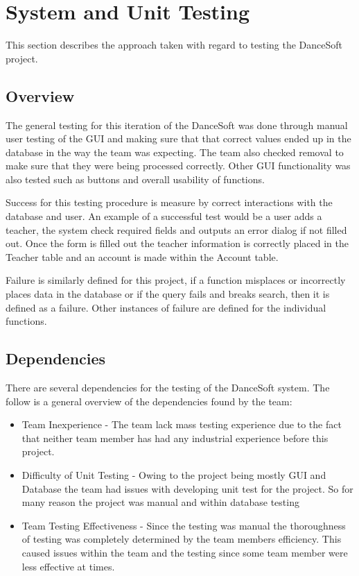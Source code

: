 

\chapter{System  and Unit Testing}

This section describes the approach taken with regard to testing the DanceSoft project. 

\section{Overview}
The general testing for this iteration of the DanceSoft was done through manual user testing of the GUI and making sure that that correct values ended up in the database in the way the team was expecting. The team also checked removal to make sure that they were being processed correctly. Other GUI functionality was also tested such as buttons and overall usability of functions.

Success for this testing procedure is measure by correct interactions with the database and user. An example of a successful test would be a user adds a teacher, the system check required fields and outputs an error dialog if not filled out. Once the form is filled out the teacher information is correctly placed in the Teacher table and an account is made within the Account table.

Failure is similarly defined for this project, if a function misplaces or incorrectly places data in the database or if the query fails and breaks search, then it is defined as a failure. Other instances of failure are defined for the individual functions.

\section{Dependencies}
There are several dependencies for the testing of the DanceSoft system. The follow is a general overview of the dependencies found by the team:

\begin{itemize}
\item Team Inexperience - The team lack mass testing experience due to the fact that neither team member has had any industrial experience before this project.
\item Difficulty of Unit Testing - Owing to the project being mostly GUI and Database the team had issues with developing unit test for the project. So for many reason the project was manual and within database testing
\item Team Testing Effectiveness - Since the testing was manual the thoroughness of testing was completely determined by the team members efficiency. This caused issues within the team and the testing since some team member were less effective at times.  
\end{itemize} 


